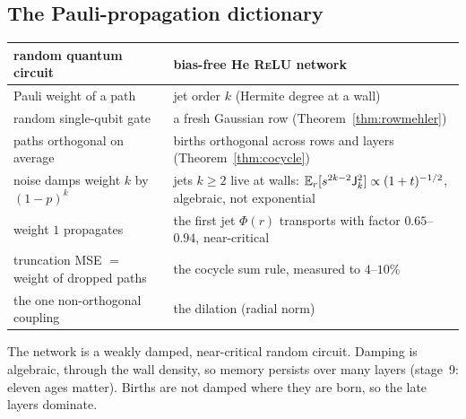 \subsection{The Pauli-propagation dictionary}
\begin{center}\small
\begin{tabular}{>{\raggedright\arraybackslash}p{5.6cm}>{\raggedright\arraybackslash}p{8.4cm}}\toprule
random quantum circuit & bias-free He \textsc{ReLU} network\\\midrule
Pauli weight of a path & jet order $k$ (Hermite degree at a wall)\\
random single-qubit gate & a fresh Gaussian row (Theorem~\ref{thm:rowmehler})\\
paths orthogonal on average & births orthogonal across rows and layers (Theorem~\ref{thm:cocycle})\\
noise damps weight $k$ by $(1-p)^k$ & jets $k\ge2$ live at walls: $\mathbb E_r[s^{2k-2}\mathsf J_k^2]\propto(1+t)^{-1/2}$, algebraic, not exponential\\
weight $1$ propagates & the first jet $\Phi(r)$ transports with factor $0.65$--$0.94$, near-critical\\
truncation MSE $=$ weight of dropped paths & the cocycle sum rule, measured to $4$--$10\%$\\
the one non-orthogonal coupling & the dilation (radial norm)\\\bottomrule
\end{tabular}
\end{center}
The network is a weakly damped, near-critical random circuit. Damping is algebraic, through the wall density, so memory persists over
many layers (stage~9: eleven ages matter). Births are not damped where they are born, so the late layers dominate.

